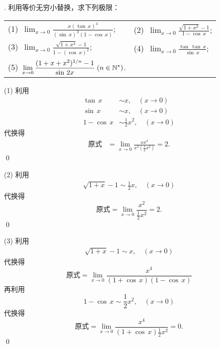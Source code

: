 . 利用等价无穷小替换，求下列极限：
\begin{table}[H]
    \centering
    \begin{tabularx}{\textwidth} {  >{\raggedright\arraybackslash}X >{\raggedright\arraybackslash}X  }
        (1)~$\displaystyle\lim_{x \to 0} \displaystyle\frac{x (\tan \, x)^4}{(\sin \, x)^3 \left(1-\cos \, x\right)}$; & (2)~$\displaystyle\lim_{x \to 0} \displaystyle\frac{\sqrt{1+x^2}-1}{1-\cos \, x}$; \\[1em]
        (3)~$\displaystyle\lim_{x \to 0} \displaystyle\frac{\sqrt{1+x^4}-1}{1-(\cos \, x)^2}$; & (4)~$\displaystyle\lim_{x \to 0}\displaystyle\frac{\tan \, \tan \, x}{\sin \, x}$; \\[1em]
        (5)~$\displaystyle\lim_{x \to 0} \displaystyle\frac{(1+x+x^2)^{1/n}-1}{\sin \, 2x} \; (n \in \mathbb{N}^\star)$.
    \end{tabularx}
\end{table}

(1) \solve 利用
\begin{align}
    \tan \, x &\sim x, \quad (x \to 0) \\
    \sin \, x &\sim x, \quad (x \to 0) \\
    1 - \cos \, x & \sim \frac{1}{2} x^2, \quad (x \to 0)
\end{align}
代换得
\begin{align}
    \text{原式} &= \lim_{x \to 0} \frac{x x^4}{x^3(\displaystyle\frac{1}{2}x^2)} = 2.
\end{align}
\qed

\medskip
(2) \solve 利用
\begin{align}
    \sqrt{1+x} -1 \sim \frac{1}{2} x, \quad (x \to 0)
\end{align}
代换得
\begin{equation}
    \text{原式} = \lim_{x \to 0} \frac{x^2}{\displaystyle\frac{1}{2}x^2} = 2.
\end{equation}
\qed

\medskip
(3) \solve 利用
\begin{align}
    \sqrt{1+x}-1 \sim x, \quad (x \to 0)
\end{align}
代换得
\begin{equation}
    \text{原式} = \lim_{x \to 0} \frac{x^4}{(1+\cos \, x) (1-\cos \, x)}
\end{equation}
再利用
\begin{equation}
    1-\cos \, x \sim \frac{1}{2}x^2, \quad (x \to 0)
\end{equation}
代换得
\begin{equation}
    \text{原式} = \lim_{x \to 0} \frac{x^4}{(1+\cos \, x) \displaystyle\frac{1}{2} x^2} = 0.
\end{equation}
\qed

